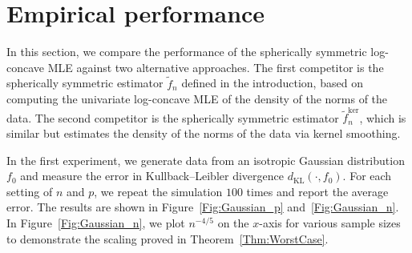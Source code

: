 \documentclass[a4paper,12pt]{article}
\begin{document}
\section{Empirical performance}
\label{Sec:Simulations}

In this section, we compare the performance of the spherically symmetric log-concave MLE against two alternative approaches. The first competitor is the spherically symmetric estimator $\tilde{f}_n$ defined in the introduction, based on computing the univariate log-concave MLE of the density of the norms of the data.  The second competitor is the spherically symmetric estimator $\tilde{f}^{\mathrm{ker}}_n$, which is similar but estimates the density of the norms of the data via kernel smoothing.

In the first experiment, we generate data from an isotropic Gaussian distribution $f_0$ and measure the error in Kullback--Leibler divergence $d_{\mathrm{KL}}(\cdot, f_0)$. For each setting of $n$ and $p$, we repeat the simulation $100$ times and report the average error. The results are shown in Figure~\ref{Fig:Gaussian_p} and~\ref{Fig:Gaussian_n}. In Figure~\ref{Fig:Gaussian_n}, we plot $n^{-4/5}$ on the $x$-axis for various sample sizes to demonstrate the scaling proved in Theorem~\ref{Thm:WorstCase}.
\end{document}

